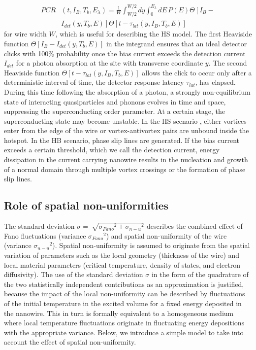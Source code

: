 \documentclass[%
reprint,
 amsmath,amssymb,
aps,
pra,
]{revtex4-1}
\begin{document}
\begin{equation}\label{PCR averaged over y}
\begin{aligned}
PCR&(t,I_B,T_b,E_\lambda)=\frac{1}{W}\int_{W/2}^{W/2}dy\int_0^{E_\lambda}dE\,P(E)\Theta\left[I_B-{} \right.\\ 
  &\left.I_{det}(y,T_b,E)\right]\Theta\left[t- \tau_{lat}( y,I_B,T_b,E)\right]
\end{aligned}
\end{equation}
for wire width \(W\), which is useful for describing the HS model. The first Heaviside function \(\Theta\left[I_B-I_{det}(y,T_b,E)\right]\) in the integrand ensures that an ideal detector  clicks with 100\% probability once the bias current exceeds the detection current \(I_{det}\) for a photon absorption at the site with transverse coordinate \(y\). The second Heaviside function \(\Theta\left[t-\tau_{lat}(y,I_B,T_b,E)\right]\)  allows the click to occur only after a deterministic interval of time, the detector response latency \(\tau_{lat}\), has elapsed. During this time following the absorption of a photon, a strongly non-equilibrium state of interacting quasiparticles and phonons evolves in time and space, suppressing the superconducting order parameter. At a certain stage, the superconducting state may become unstable. In the HS scenario \cite{engel_detection_2015,vodolazov_single-photon_2017}, either vortices enter from the edge of the wire or vortex-antivortex pairs are unbound inside the hotspot. In the HB scenario, phase slip lines are generated. If the bias current exceeds a certain threshold, which we call the detection current, energy dissipation in the current carrying nanowire results in the nucleation and growth of a normal domain through multiple vortex crossings or the formation of phase slip lines.

\subsection{\label{sec:RoleOfNU}Role of spatial non-uniformities}
\quad The standard deviation \(\sigma = \sqrt[]{{\sigma_{Fano}}^2+{\sigma_{n-u}}^2}\) describes the combined effect of Fano fluctuations (variance \({\sigma_{Fano}}^2\)) \cite{kozorezov_fano_2017} and spatial non-uniformity of the wire (variance  \({\sigma_{n-u}}^2\)). Spatial non-uniformity is assumed to originate from the spatial variation of parameters such as the local geometry (thickness of the wire) and local material parameters (critical temperature, density of states, and electron diffusivity). The use of the standard deviation \(\sigma\) in the form of the quadrature of the two statistically independent contributions as an approximation is justified, because the impact of the local non-uniformity can be described by fluctuations of the initial temperature in the excited volume for a fixed energy deposited in the nanowire. This in turn is formally equivalent to a homogeneous medium where local temperature fluctuations originate in fluctuating energy depositions with the appropriate variance. Below, we introduce a simple model to take into account the effect of spatial non-uniformity.
\end{document}
